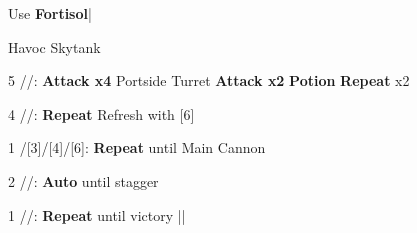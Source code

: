 \begin{mainlist}
	\item Use \textbf{Fortisol}|
\end{mainlist}
\begin{fight}{Havoc Skytank}
	\item [5] \com/\com/\syn: \textbf{Attack x4} Portside Turret \to \textbf{Attack x2} \to \textbf{Potion} \to \textbf{Repeat} x2
	\item [4] \com/\com/\med: \textbf{Repeat} \to Refresh with [6]
	\item [1]/[3]/[4]/[6]: \textbf{Repeat} until Main Cannon
	\item [2] \rav/\com/\rav: \textbf{Auto} until stagger
	\item [1] \com/\com/\rav: \textbf{Repeat} until victory |\skip|\save
\end{fight}
